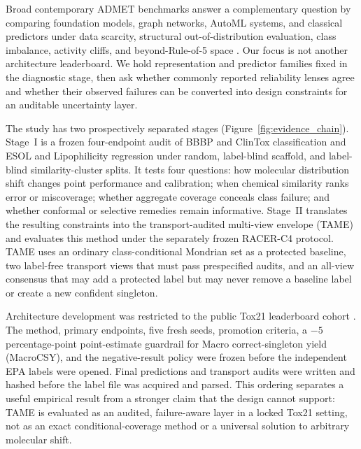 Broad contemporary ADMET benchmarks answer a complementary question by comparing foundation models, graph networks, AutoML systems, and classical predictors under data scarcity, structural out-of-distribution evaluation, class imbalance, activity cliffs, and beyond-Rule-of-5 space \citep{zhao2026revisiting}. Our focus is not another architecture leaderboard. We hold representation and predictor families fixed in the diagnostic stage, then ask whether commonly reported reliability lenses agree and whether their observed failures can be converted into design constraints for an auditable uncertainty layer.

The study has two prospectively separated stages (Figure~\ref{fig:evidence_chain}). Stage~I is a frozen four-endpoint audit of BBBP and ClinTox classification and ESOL and Lipophilicity regression under random, label-blind scaffold, and label-blind similarity-cluster splits. It tests four questions: how molecular distribution shift changes point performance and calibration; when chemical similarity ranks error or miscoverage; whether aggregate coverage conceals class failure; and whether conformal or selective remedies remain informative. Stage~II translates the resulting constraints into the transport-audited multi-view envelope (TAME) and evaluates this method under the separately frozen RACER-C4 protocol. TAME uses an ordinary class-conditional Mondrian set as a protected baseline, two label-free transport views that must pass prespecified audits, and an all-view consensus that may add a protected label but may never remove a baseline label or create a new confident singleton.

Architecture development was restricted to the public Tox21 leaderboard cohort \citep{huang2016tox21challenge}. The method, primary endpoints, five fresh seeds, promotion criteria, a $-5$ percentage-point point-estimate guardrail for Macro correct-singleton yield (MacroCSY), and the negative-result policy were frozen before the independent EPA labels were opened. Final predictions and transport audits were written and hashed before the label file was acquired and parsed. This ordering separates a useful empirical result from a stronger claim that the design cannot support: TAME is evaluated as an audited, failure-aware layer in a locked Tox21 setting, not as an exact conditional-coverage method or a universal solution to arbitrary molecular shift.

